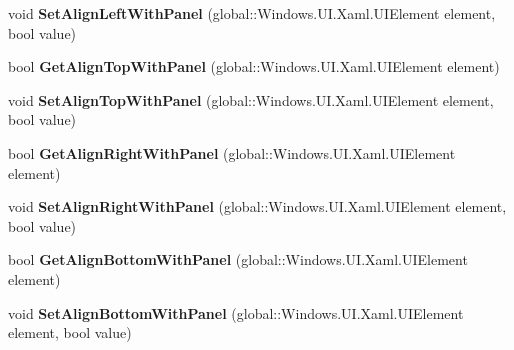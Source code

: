 \begin{DoxyCompactItemize}
void {\bfseries Set\+Align\+Left\+With\+Panel} (global\+::\+Windows.\+U\+I.\+Xaml.\+U\+I\+Element element, bool value)
\item 
\mbox{\label{interface_windows_1_1_u_i_1_1_xaml_1_1_controls_1_1_i_relative_panel_statics_a190b602dadc7feff901b6c1ab1906898}} 
bool {\bfseries Get\+Align\+Top\+With\+Panel} (global\+::\+Windows.\+U\+I.\+Xaml.\+U\+I\+Element element)
\item 
\mbox{\label{interface_windows_1_1_u_i_1_1_xaml_1_1_controls_1_1_i_relative_panel_statics_a7980252289e1bd42485241913f9afdad}} 
void {\bfseries Set\+Align\+Top\+With\+Panel} (global\+::\+Windows.\+U\+I.\+Xaml.\+U\+I\+Element element, bool value)
\item 
\mbox{\label{interface_windows_1_1_u_i_1_1_xaml_1_1_controls_1_1_i_relative_panel_statics_a61fabd1c8713c07b5ac48fa9a27f4ae5}} 
bool {\bfseries Get\+Align\+Right\+With\+Panel} (global\+::\+Windows.\+U\+I.\+Xaml.\+U\+I\+Element element)
\item 
\mbox{\label{interface_windows_1_1_u_i_1_1_xaml_1_1_controls_1_1_i_relative_panel_statics_a2c4edfaf4e3bacc3f959ee0a58907e8a}} 
void {\bfseries Set\+Align\+Right\+With\+Panel} (global\+::\+Windows.\+U\+I.\+Xaml.\+U\+I\+Element element, bool value)
\item 
\mbox{\label{interface_windows_1_1_u_i_1_1_xaml_1_1_controls_1_1_i_relative_panel_statics_ae0d4717061b42365289442969aba8977}} 
bool {\bfseries Get\+Align\+Bottom\+With\+Panel} (global\+::\+Windows.\+U\+I.\+Xaml.\+U\+I\+Element element)
\item 
\mbox{\label{interface_windows_1_1_u_i_1_1_xaml_1_1_controls_1_1_i_relative_panel_statics_a0282f7f3fedefd9e7725ff429dfb714b}} 
void {\bfseries Set\+Align\+Bottom\+With\+Panel} (global\+::\+Windows.\+U\+I.\+Xaml.\+U\+I\+Element element, bool value)
\item 

\end{DoxyCompactItemize}
